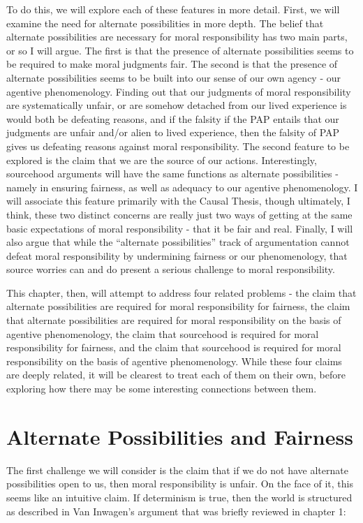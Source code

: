 \documentclass[phd,12pt,oneside,paper=letterpaper]{ubcthesis}
\begin{document}
To do this, we will explore each of these features in more detail. First, we will examine the need for alternate possibilities in more depth. The belief that alternate possibilities are necessary for moral responsibility has two main parts, or so I will argue. The first is that the presence of alternate possibilities seems to be required to make moral judgments fair. The second is that the presence of alternate possibilities seems to be built into our sense of our own agency - our agentive phenomenology. Finding out that our judgments of moral responsibility are systematically unfair, or are somehow detached from our lived experience is would both be defeating reasons, and if the falsity if the PAP entails that our judgments are unfair and/or alien to lived experience, then the falsity of PAP gives us defeating reasons against moral responsibility. The second feature to be explored is the claim that we are the source of our actions. Interestingly, sourcehood arguments will have the same functions as alternate possibilities - namely in ensuring fairness, as well as adequacy to our agentive phenomenology. I will associate this feature primarily with the Causal Thesis, though ultimately, I think, these two distinct concerns are really just two ways of getting at the same basic expectations of moral responsibility - that it be fair and real. Finally, I will also argue that while the ``alternate possibilities'' track of argumentation cannot defeat moral responsibility by undermining fairness or our phenomenology, that source worries can and do present a serious challenge to moral responsibility. 

This chapter, then, will attempt to address four related problems - the claim that alternate possibilities are required for moral responsibility for fairness, the claim that alternate possibilities are required for moral responsibility on the basis of agentive phenomenology, the claim that sourcehood is required for moral responsibility for fairness, and the claim that sourcehood is required for moral responsibility on the basis of agentive phenomenology. While these four claims are deeply related, it will be clearest to treat each of them on their own, before exploring how there may be some interesting connections between them.

\section{Alternate Possibilities and Fairness}
The first challenge we will consider is the claim that if we do not have alternate possibilities open to us, then moral responsibility is unfair. On the face of it, this seems like an intuitive claim. If determinism is true, then the world is structured as described in Van Inwagen's \citeyearpar{inwagen1978} argument that was briefly reviewed in chapter 1:
\end{document}
